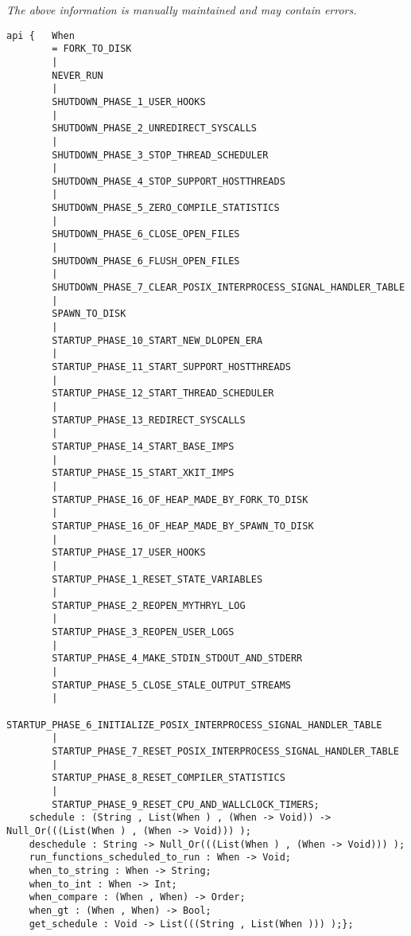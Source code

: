 \label{api:Run\_At\_\_Premicrothread}

{\tiny \it The above information is manually maintained and may contain errors.}
\begin{verbatim}
api {   When
        = FORK_TO_DISK
        |
        NEVER_RUN
        |
        SHUTDOWN_PHASE_1_USER_HOOKS
        |
        SHUTDOWN_PHASE_2_UNREDIRECT_SYSCALLS
        |
        SHUTDOWN_PHASE_3_STOP_THREAD_SCHEDULER
        |
        SHUTDOWN_PHASE_4_STOP_SUPPORT_HOSTTHREADS
        |
        SHUTDOWN_PHASE_5_ZERO_COMPILE_STATISTICS
        |
        SHUTDOWN_PHASE_6_CLOSE_OPEN_FILES
        |
        SHUTDOWN_PHASE_6_FLUSH_OPEN_FILES
        |
        SHUTDOWN_PHASE_7_CLEAR_POSIX_INTERPROCESS_SIGNAL_HANDLER_TABLE
        |
        SPAWN_TO_DISK
        |
        STARTUP_PHASE_10_START_NEW_DLOPEN_ERA
        |
        STARTUP_PHASE_11_START_SUPPORT_HOSTTHREADS
        |
        STARTUP_PHASE_12_START_THREAD_SCHEDULER
        |
        STARTUP_PHASE_13_REDIRECT_SYSCALLS
        |
        STARTUP_PHASE_14_START_BASE_IMPS
        |
        STARTUP_PHASE_15_START_XKIT_IMPS
        |
        STARTUP_PHASE_16_OF_HEAP_MADE_BY_FORK_TO_DISK
        |
        STARTUP_PHASE_16_OF_HEAP_MADE_BY_SPAWN_TO_DISK
        |
        STARTUP_PHASE_17_USER_HOOKS
        |
        STARTUP_PHASE_1_RESET_STATE_VARIABLES
        |
        STARTUP_PHASE_2_REOPEN_MYTHRYL_LOG
        |
        STARTUP_PHASE_3_REOPEN_USER_LOGS
        |
        STARTUP_PHASE_4_MAKE_STDIN_STDOUT_AND_STDERR
        |
        STARTUP_PHASE_5_CLOSE_STALE_OUTPUT_STREAMS
        |
        STARTUP_PHASE_6_INITIALIZE_POSIX_INTERPROCESS_SIGNAL_HANDLER_TABLE
        |
        STARTUP_PHASE_7_RESET_POSIX_INTERPROCESS_SIGNAL_HANDLER_TABLE
        |
        STARTUP_PHASE_8_RESET_COMPILER_STATISTICS
        |
        STARTUP_PHASE_9_RESET_CPU_AND_WALLCLOCK_TIMERS;
    schedule : (String , List(When ) , (When -> Void)) -> Null_Or(((List(When ) , (When -> Void))) );
    deschedule : String -> Null_Or(((List(When ) , (When -> Void))) );
    run_functions_scheduled_to_run : When -> Void;
    when_to_string : When -> String;
    when_to_int : When -> Int;
    when_compare : (When , When) -> Order;
    when_gt : (When , When) -> Bool;
    get_schedule : Void -> List(((String , List(When ))) );};
\end{verbatim}
